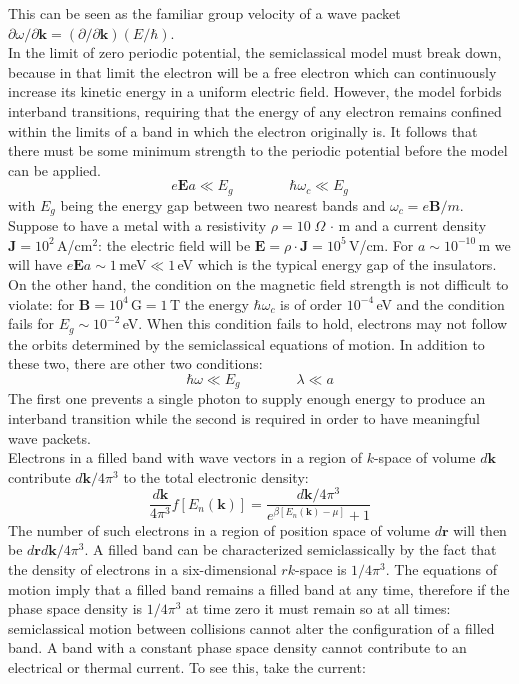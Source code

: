 \documentclass[10.75pt,a4paper,openright,bottom=2cm]{article}
\renewcommand{\Vec}[1]{\boldsymbol{#1}}
\begin{document}
This can be seen as the familiar group velocity of a wave packet $\partial\omega/\partial\Vec{k}=(\partial/\partial\Vec{k})(E/\hbar)$.\\
In the limit of zero periodic potential, the semiclassical model must break down, because in that limit the electron will be a free electron which can continuously increase its kinetic energy in a uniform electric field. However, the model forbids interband transitions, requiring that the energy of any electron remains confined within the limits of a band in which the electron originally is. It follows that there must be some minimum strength to the periodic potential before the model can be applied. 
\[
e\Vec{E}a\ll E_g \qquad\qquad \hbar\omega_c\ll E_g 
\]
with $E_g$ being the energy gap between two nearest bands and $\omega_c=e\Vec{B}/m$.\\
Suppose to have a metal with a resistivity $\rho=10\;\Omega\,\cdot$\,m and a current density $\Vec{J}=10^2$\,A/cm$^2$: the electric field will be $\Vec{E}=\rho\cdot\Vec{J}=10^5$\,V/cm. For $a\sim10^{-10}$\,m we will have $e\Vec{E}a\sim1$\,meV$\ll1$\,eV which is the typical energy gap of the insulators. On the other hand, the condition on the magnetic field strength is not difficult to violate: for $\Vec{B}=10^4$\,G$=1$\,T the energy $\hbar\omega_c$ is of order $10^{-4}$\,eV and the condition fails for $E_g\sim10^{-2}$\,eV. When this condition fails to hold, electrons may not follow the orbits determined by the semiclassical equations of motion. In addition to these two, there are other two conditions:
\[
\hbar\omega\ll E_g \qquad \qquad \lambda\ll a
\]
The first one prevents a single photon to supply enough energy to produce an interband transition while the second is required in order to have meaningful wave packets.\\
Electrons in a filled band with wave vectors in a region of $k$-space of volume $d\Vec{k}$ contribute $d\Vec{k}/4\pi^3$ to the total electronic density:
\[
\frac{d\Vec{k}}{4\pi^3}f[E_n(\Vec{k})]=\frac{d\Vec{k}/4\pi^3}{e^{\beta[E_n(\Vec{k})-\mu]}+1}
\]
The number of such electrons in a region of position space of volume $d\Vec{r}$ will then be $d\Vec{r}d\Vec{k}/4\pi^3$. A filled band can be characterized semiclassically by the fact that the density of electrons in a six-dimensional $rk$-space is $1/4\pi^3$. The equations of motion imply that a filled band remains a filled band at any time, therefore if the phase space density is $1/4\pi^3$ at time zero it must remain so at all times: semiclassical motion between collisions cannot alter the configuration of a filled band. A band with a constant phase space density cannot contribute to an electrical or thermal current. To see this, take the current:
\end{document}
